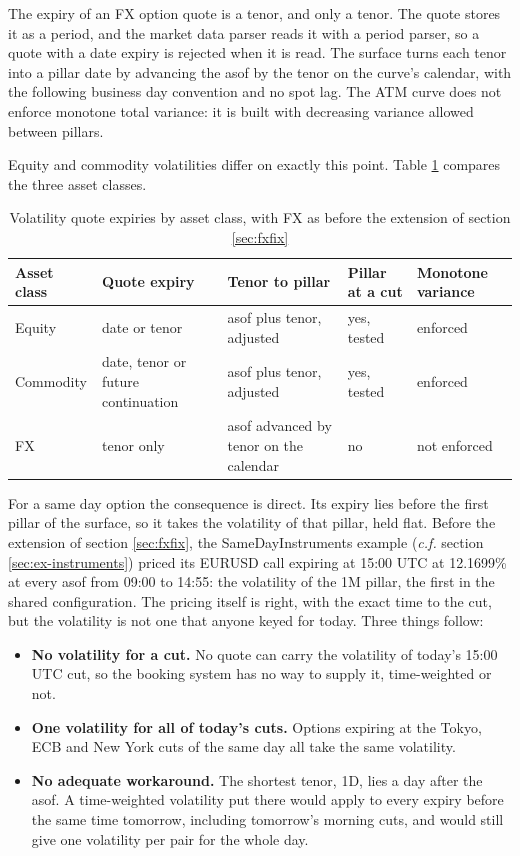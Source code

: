 \documentclass[12pt, a4paper]{article}
\begin{document}
The expiry of an FX option quote is a tenor, and only a tenor. The quote stores it as a period, and the market data
parser reads it with a period parser, so a quote with a date expiry is rejected when it is read. The surface turns each
tenor into a pillar date by advancing the asof by the tenor on the curve's calendar, with the following business day
convention and no spot lag. The ATM curve does not enforce monotone total variance: it is built with decreasing variance
allowed between pillars.

Equity and commodity volatilities differ on exactly this point. Table \ref{tab:volexpiries} compares the three asset
classes.

\begin{table}[H]
\centering
\small
\begin{tabular}{|l|>{\raggedright\arraybackslash}p{3.6cm}|>{\raggedright\arraybackslash}p{3.0cm}|>{\raggedright\arraybackslash}p{2.6cm}|>{\raggedright\arraybackslash}p{2.0cm}|}
\hline
Asset class & Quote expiry & Tenor to pillar & Pillar at a cut & Monotone variance \\
\hline
Equity & date or tenor & asof plus tenor, adjusted & yes, tested & enforced \\
\hline
Commodity & date, tenor or future continuation & asof plus tenor, adjusted & yes, tested & enforced \\
\hline
FX & tenor only & asof advanced by tenor on the calendar & no & not enforced \\
\hline
\end{tabular}
\caption{Volatility quote expiries by asset class, with FX as before the extension of section \ref{sec:fxfix}}
\label{tab:volexpiries}
\end{table}

For a same day option the consequence is direct. Its expiry lies before the first pillar of the surface, so it takes
the volatility of that pillar, held flat. Before the extension of section \ref{sec:fxfix}, the SameDayInstruments
example (\textit{c.f.} section \ref{sec:ex-instruments}) priced its EURUSD call expiring at 15:00 UTC at 12.1699\% at every
asof from 09:00 to 14:55: the volatility of the 1M pillar, the first in the shared configuration. The pricing itself is right, with the exact time to the cut, but the
volatility is not one that anyone keyed for today. Three things follow:

\begin{itemize}
\item \textbf{No volatility for a cut.} No quote can carry the volatility of today's 15:00 UTC cut, so the booking
  system has no way to supply it, time-weighted or not.
\item \textbf{One volatility for all of today's cuts.} Options expiring at the Tokyo, ECB and New York cuts of the same
  day all take the same volatility.
\item \textbf{No adequate workaround.} The shortest tenor, 1D, lies a day after the asof. A time-weighted volatility put
  there would apply to every expiry before the same time tomorrow, including tomorrow's morning cuts, and would still
  give one volatility per pair for the whole day.
\end{itemize}
\end{document}

